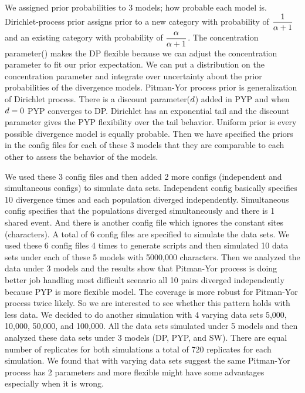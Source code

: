 \documentclass[letterpaper,12pt]{article}
\begin{document}
We assigned prior probabilities to 3 models; how probable each model is. Dirichlet-process prior 
assigns prior to a new category with probability of \(\dfrac{1}{\alpha +1}\) and an existing category with probability of \(\dfrac{\alpha}{\alpha+1}\). The concentration parameter(\concentration) 
makes the DP flexible because we can adjust the concentration parameter to fit our prior expectation. We can put a distribution on the 
concentration parameter and integrate over uncertainty about the prior probabilities of the divergence models. Pitman-Yor process prior is 
generalization of Dirichlet process. There is a discount parameter($d$) added in PYP and when $d= 0$ PYP converges to DP. Dirichlet has an exponential tail 
and the discount parameter gives the PYP flexibility over the tail behavior. Uniform prior is every possible divergence model is equally probable. 
Then we have specified the priors in the config files for each of these 3 models that they are comparable to each other to assess the behavior of the models. 

We used these 3 config files and then added 2 more configs (independent and simultaneous configs) to simulate data sets. Independent config 
basically specifies 10 divergence times and each population diverged independently. Simultaneous config specifies that the populations 
diverged simultaneously and there is 1 shared event. And there is another config file which ignores the constant sites (characters). A total of 6 config 
files are specified to simulate the data sets. We used these 6 config files 4 times to generate scripts and then simulated 10 data sets under each of 
these 5 models with 5000,000 characters. Then we analyzed the data under 3 models and the results show that Pitman-Yor process is doing better job handling 
most difficult scenario all 10 pairs diverged independently because PYP is more flexible model. The coverage is more robust for Pitman-Yor process twice likely.
So we are interested to see whether this pattern holds with less data. We decided to do another simulation with 4 varying data sets 5,000, 10,000, 50,000, and 100,000. 
All the data sets simulated under 5 models and then analyzed these data sets under 3 models (DP, PYP, and SW). There are equal number of replicates for both simulations 
a total of 720 replicates for each simulation. We found that with varying data sets suggest the same Pitman-Yor process has 2 parameters and more flexible might 
have some advantages especially when it is wrong.
\end{document}
